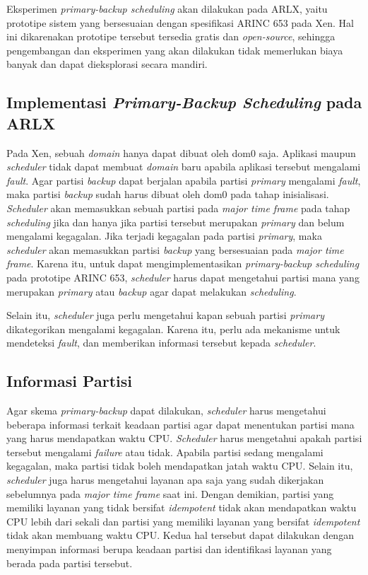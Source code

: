 Eksperimen \textit{primary-backup scheduling} akan dilakukan pada ARLX, yaitu prototipe sistem
yang bersesuaian dengan spesifikasi ARINC 653 pada Xen. Hal ini dikarenakan prototipe tersebut
tersedia gratis dan \textit{open-source}, sehingga pengembangan dan eksperimen yang akan
dilakukan tidak memerlukan biaya banyak dan dapat dieksplorasi secara mandiri.

\subsection{Implementasi \textit{Primary-Backup Scheduling} pada ARLX}

Pada Xen, sebuah \textit{domain} hanya dapat dibuat oleh dom0 saja.  Aplikasi maupun
\textit{scheduler} tidak dapat membuat \textit{domain} baru apabila aplikasi tersebut mengalami
\textit{fault}.  Agar partisi \textit{backup} dapat berjalan apabila partisi \textit{primary}
mengalami \textit{fault}, maka partisi \textit{backup} sudah harus dibuat oleh dom0 pada tahap
inisialisasi.  \textit{Scheduler} akan memasukkan sebuah partisi pada \textit{major time frame}
pada tahap \textit{scheduling} jika dan hanya jika partisi tersebut merupakan \textit{primary}
dan belum mengalami kegagalan.  Jika terjadi kegagalan pada partisi \textit{primary}, maka
\textit{scheduler} akan memasukkan partisi \textit{backup} yang bersesuaian pada \textit{major
time frame}.  Karena itu, untuk dapat mengimplementasikan \textit{primary-backup scheduling}
pada prototipe ARINC 653, \textit{scheduler} harus dapat mengetahui partisi mana yang merupakan
\textit{primary} atau \textit{backup} agar dapat melakukan \textit{scheduling}.

Selain itu, \textit{scheduler} juga perlu mengetahui kapan sebuah partisi \textit{primary}
dikategorikan mengalami kegagalan.  Karena itu, perlu ada mekanisme untuk mendeteksi
\textit{fault}, dan memberikan informasi tersebut kepada \textit{scheduler}.

\subsection{Informasi Partisi}
\label{section:informasi_partisi}

Agar skema \textit{primary-backup} dapat dilakukan, \textit{scheduler} harus mengetahui beberapa
informasi terkait keadaan partisi agar dapat menentukan partisi mana yang harus mendapatkan
waktu CPU. \textit{Scheduler} harus mengetahui apakah partisi tersebut mengalami
\textit{failure} atau tidak. Apabila partisi sedang mengalami kegagalan, maka partisi tidak
boleh mendapatkan jatah waktu CPU. Selain itu, \textit{scheduler} juga harus mengetahui
layanan apa saja yang sudah dikerjakan sebelumnya pada \textit{major time frame} saat
ini. Dengan demikian, partisi yang memiliki layanan yang tidak bersifat
\textit{idempotent} tidak akan mendapatkan waktu CPU lebih dari sekali dan partisi yang memiliki
layanan yang bersifat \textit{idempotent} tidak akan membuang waktu CPU. Kedua hal
tersebut dapat dilakukan dengan menyimpan informasi berupa keadaan partisi dan identifikasi
layanan yang berada pada partisi tersebut.

